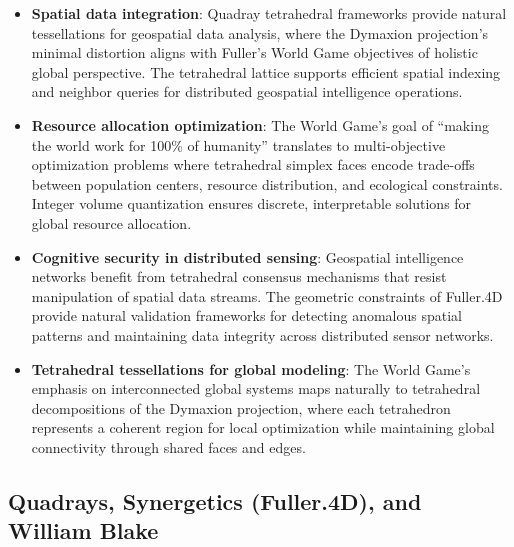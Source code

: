 \documentclass[
  10pt,
]{article}
\providecommand{\tightlist}{%
  \setlength{\itemsep}{0pt}\setlength{\parskip}{0pt}}
\begin{document}
\begin{itemize}
\tightlist
\item
  \textbf{Spatial data integration}: Quadray tetrahedral frameworks
  provide natural tessellations for geospatial data analysis, where the
  Dymaxion projection's minimal distortion aligns with Fuller's World
  Game objectives of holistic global perspective. The tetrahedral
  lattice supports efficient spatial indexing and neighbor queries for
  distributed geospatial intelligence operations.
\item
  \textbf{Resource allocation optimization}: The World Game's goal of
  ``making the world work for 100\% of humanity'' translates to
  multi-objective optimization problems where tetrahedral simplex faces
  encode trade-offs between population centers, resource distribution,
  and ecological constraints. Integer volume quantization ensures
  discrete, interpretable solutions for global resource allocation.
\item
  \textbf{Cognitive security in distributed sensing}: Geospatial
  intelligence networks benefit from tetrahedral consensus mechanisms
  that resist manipulation of spatial data streams. The geometric
  constraints of Fuller.4D provide natural validation frameworks for
  detecting anomalous spatial patterns and maintaining data integrity
  across distributed sensor networks.
\item
  \textbf{Tetrahedral tessellations for global modeling}: The World
  Game's emphasis on interconnected global systems maps naturally to
  tetrahedral decompositions of the Dymaxion projection, where each
  tetrahedron represents a coherent region for local optimization while
  maintaining global connectivity through shared faces and edges.
\end{itemize}

\hypertarget{quadrays-synergetics-fuller.4d-and-william-blake}{%
\subsection{Quadrays, Synergetics (Fuller.4D), and William
Blake}\label{quadrays-synergetics-fuller.4d-and-william-blake}}
\end{document}
